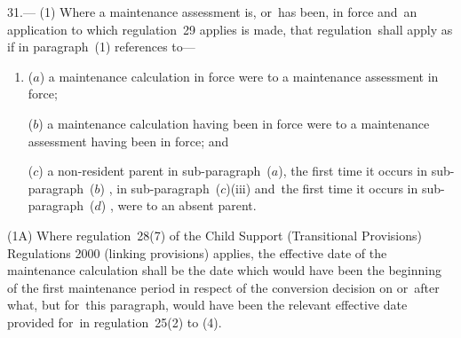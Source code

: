 \documentclass[12pt,a4paper]{article}
\begin{document}
31.---%
%
%
%
(1) Where a maintenance assessment is, or~has been, in force and~an application to which regulation~29 applies is made, 
that regulation~shall apply as if in paragraph~(1) references to—
\begin{enumerate}\item[]
($a$) a maintenance calculation in force were to a maintenance assessment in force;

($b$) a maintenance calculation having been in force were to a maintenance assessment having been in force; and

($c$) a non-resident parent in sub-paragraph~($a$), the first time it occurs in sub-paragraph~($b$)%
, in sub-paragraph~($c$)(iii) and~the first time it occurs in sub-paragraph~($d$)%
, were to an absent parent.
\end{enumerate}

(1A) Where regulation~28(7) of the Child Support (Transitional Provisions) Regulations 2000 (linking provisions) applies, the effective date of the maintenance calculation shall be the date which would have been the beginning of the first maintenance period in respect of the conversion decision on or~after what, but for~this paragraph, would have been the relevant effective date provided for~in regulation~25(2) to (4).
\end{document}
